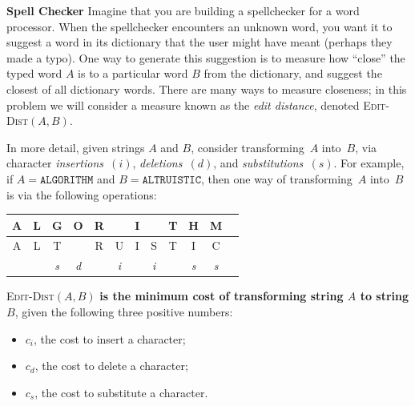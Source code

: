 \documentclass[11pt,addpoints]{exam}
\begin{document}
\begin{questions}
 
\question \textbf{Spell Checker}  Imagine that you are building a spellchecker for a word processor.
    When the spellchecker encounters an unknown word, you want it to suggest a word in its dictionary that the user might have meant (perhaps they made a typo).
    One way to generate this suggestion is to measure how ``close'' the typed word $A$ is to a particular word $B$ from the dictionary, and suggest the closest of all dictionary words.
    There are many ways to measure closeness; in this problem we will consider a measure known as the \textit{edit distance}, denoted \textsc{Edit-Dist}$(A, B)$.
    
    In more detail, given strings $A$ and $B$, consider transforming~$A$ into~$B$, via character \textit{insertions~$(i)$}, \textit{deletions~$(d)$}, and \textit{substitutions~$(s)$}.
    For example, if $A = \mathtt{ALGORITHM}$ and $B = \mathtt{ALTRUISTIC}$, then one way of transforming~$A$ into~$B$ is via the following operations:
    \begin{center}
    \begin{tabular}{|c|c|c|c|c|c|c|c|c|c|c|c|} 
    \hline
    A & L & G & O & R &  & I & & T & H & M \\ 
    \hline
    A & L & T &  & R & U & I & S & T & I & C\\ 
    \hline
    &  & \textit{s} & \textit{d} & & \textit{i} & & \textit{i} & & \textit{s} & \textit{s}\\
    \hline
    \end{tabular}
    \end{center}
    \textsc{Edit-Dist}$(A, B)$ \textbf{is the minimum cost of transforming string $A$ to string $B$}, given the following three positive numbers: 
    \begin{itemize}
    \item $c_i$, the cost to insert a character;
    \item $c_d$, the cost to delete a character;
    \item $c_s$, the cost to substitute a character.
    \end{itemize}
    

\end{questions}
\end{document}
